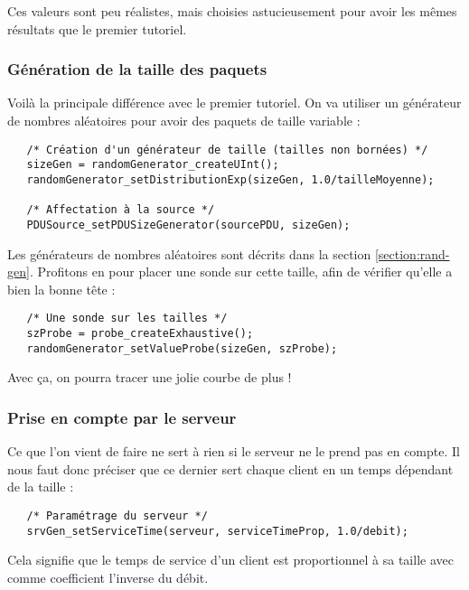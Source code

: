    Ces valeurs sont peu réalistes, mais choisies astucieusement pour
avoir les mêmes résultats que le premier tutoriel.

%
\subsubsection{Génération de la taille des paquets}

   Voilà la principale différence avec le premier tutoriel. On va
utiliser un générateur de nombres aléatoires pour avoir des paquets de
taille variable :

\begin{verbatim}
   /* Création d'un générateur de taille (tailles non bornées) */
   sizeGen = randomGenerator_createUInt();
   randomGenerator_setDistributionExp(sizeGen, 1.0/tailleMoyenne);

   /* Affectation à la source */
   PDUSource_setPDUSizeGenerator(sourcePDU, sizeGen);
\end{verbatim}

  Les générateurs de nombres aléatoires sont décrits dans la section
\ref{section:rand-gen}. Profitons en pour placer une sonde sur cette
taille, afin de vérifier qu'elle a bien la bonne tête :

\begin{verbatim}
   /* Une sonde sur les tailles */
   szProbe = probe_createExhaustive();
   randomGenerator_setValueProbe(sizeGen, szProbe);
\end{verbatim}

   Avec ça, on pourra tracer une jolie courbe de plus !

%
\subsubsection{Prise en compte par le serveur}

   Ce que l'on vient de faire ne sert à rien si le serveur ne le prend
pas en compte. Il nous faut donc préciser que ce dernier sert chaque
client en un temps dépendant de la taille :

\begin{verbatim}
   /* Paramétrage du serveur */
   srvGen_setServiceTime(serveur, serviceTimeProp, 1.0/debit);
\end{verbatim}

   Cela signifie que le temps de service d'un client est proportionnel
à sa taille avec comme coefficient l'inverse du débit.

